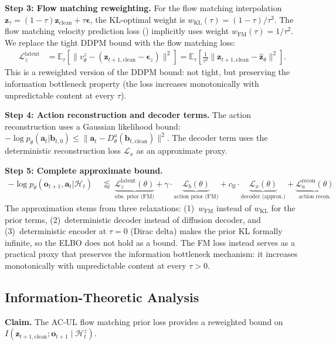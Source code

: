 \documentclass{article}
\newcommand{\vo}{\bm{o}}
\newcommand{\vz}{\bm{z}}
\newcommand{\va}{\bm{a}}
\newcommand{\vb}{\bm{b}}
\newcommand{\vep}{\bm{\epsilon}}
\newcommand{\E}{\mathbb{E}}
\newcommand{\KL}{\mathrm{KL}}
\newcommand{\loss}{\mathcal{L}}
\begin{document}
\textbf{Step 3: Flow matching reweighting.}
For the flow matching interpolation $\vz_\tau = (1-\tau)\vz_{\text{clean}} + \tau\vep$, the KL-optimal weight is $w_{\KL}(\tau) = (1-\tau)/\tau^3$. The flow matching velocity prediction loss () implicitly uses weight $w_{\text{FM}}(\tau) = 1/\tau^2$. We replace the tight DDPM bound with the flow matching loss:
\begin{align}
  \loss_z^{\text{latent}} &= \E_\tau\!\left[\|v_\theta^z - (\vz_{t+1,\text{clean}} - \vep_z)\|^2\right] = \E_\tau\!\left[\frac{1}{\tau^2}\|\vz_{t+1,\text{clean}} - \hat{\vz}_\theta\|^2\right].
  \label{eq:app_fm_loss}
\end{align}
This is a reweighted version of the DDPM bound: not tight, but preserving the information bottleneck property (the loss increases monotonically with unpredictable content at every $\tau$).

\textbf{Step 4: Action reconstruction and decoder terms.}
The action reconstruction uses a Gaussian likelihood bound: $-\log p_\theta(\va_t | \vb_{t,0}) \leq \|\va_t - D_\theta^a(\vb_{t,\text{clean}})\|^2$.
The decoder term uses the deterministic reconstruction loss $\loss_x$ as an approximate proxy.

\textbf{Step 5: Complete approximate bound.}
\begin{align}
  -\log p_\theta(\vo_{t+1}, \va_t | \mathcal{H}_t) &\;\lessapprox\; \underbrace{\loss_z^{\text{latent}}(\theta)}_{\text{obs.\ prior (FM)}} + \gamma \cdot \underbrace{\loss_b(\theta)}_{\text{action prior (FM)}} + c_{\text{lf}} \cdot \underbrace{\loss_x(\theta)}_{\text{decoder (approx.)}} + \underbrace{\loss_a^{\text{recon}}(\theta)}_{\text{action recon.}}
  \label{eq:app_total}
\end{align}
The approximation stems from three relaxations: (1)~$w_{\text{FM}}$ instead of $w_{\KL}$ for the prior terms, (2)~deterministic decoder instead of diffusion decoder, and (3)~deterministic encoder at $\tau{=}0$ (Dirac delta) makes the prior KL formally infinite, so the ELBO does not hold as a bound. The FM loss instead serves as a practical proxy that preserves the information bottleneck mechanism: it increases monotonically with unpredictable content at every $\tau > 0$.

\subsection{Information-Theoretic Analysis}
\label{app:info_theory}

\textbf{Claim.}
The AC-UL flow matching prior loss provides a reweighted bound on $I(\vz_{t+1,\text{clean}}; \vo_{t+1} \mid \mathcal{H}_t^z)$.
\end{document}

